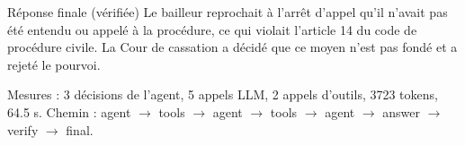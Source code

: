 \begin{answerbox}{Réponse finale (vérifiée)}
Le bailleur reprochait à l'arrêt d'appel qu'il n'avait pas été entendu ou appelé à la procédure, ce qui violait l'article 14 du code de procédure civile. La Cour de cassation a décidé que ce moyen n'est pas fondé et a rejeté le pourvoi.
\par{}
\end{answerbox}
Mesures : 3 décisions de l'agent, 5 appels LLM, 2 appels d'outils, 3723 tokens, 64.5 s. Chemin : agent $\rightarrow$ tools $\rightarrow$ agent $\rightarrow$ tools $\rightarrow$ agent $\rightarrow$ answer $\rightarrow$ verify $\rightarrow$ final.\par
